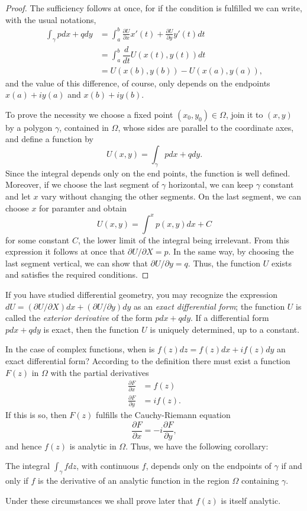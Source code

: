 \begin{proof}
The sufficiency follows at once, for if the condition is fulfilled we can write, with the usual notations,
\begin{align*}
    \int_{\gamma} p dx+q dy &= \int_{a}^{b} \frac{\partial U}{\partial x} x'(t) + \frac{\partial U}{\partial y} y'(t) dt \\
    &= \int_{a}^{b} \dfrac{d}{dt}U(x(t),y(t))dt \\
    &=U(x(b),y(b))-U(x(a),y(a)),
\end{align*}
and the value of this difference, of course, only depends on the endpoints $x(a)+iy(a)$ and $x(b)+iy(b)$.

To prove the necessity we choose a fixed point $(x_0,y_0) \in \Omega$, join it to $(x,y)$ by a polygon $\gamma$, contained in $\Omega$, whose sides are parallel to the coordinate axes, and define a function by $$U(x,y)=\int_{\gamma} p dx+q dy.$$ Since the integral depends only on the end points, the function is well defined. Moreover, if we choose the last segment of $\gamma$ horizontal, we can keep $\gamma$ constant and let $x$ vary without changing the other segments. On the last segment, we can choose $x$ for paramter and obtain $$U(x,y)=\int^{x}p(x,y)dx+C$$ for some constant $C$, the lower limit of the integral being irrelevant. From this expression it follows at once that $\partial U/\partial X=p$. In the same way, by choosing the last segment vertical, we can show that $\partial U/\partial y=q$. Thus, the function $U$ exists and satisfies the required conditions.
\end{proof}

If you have studied differential geometry, you may recognize the expression $dU=(\partial U/\partial X)dx+(\partial U/\partial y)dy$ as an \emph{exact differential form}; the function $U$ is called the \emph{exterior derivative} of the form $p dx+q dy$. If a differential form $p dx+q dy$ is exact, then the function $U$ is uniquely determined, up to a constant.

In the case of complex functions, when is $f(z)dz=f(z)dx+if(z)dy$ an exact differential form? According to the definition there must exist a function $F(z)$ in $\Omega$ with the partial derivatives
\begin{align*}
\frac{\partial F}{\partial x} &= f(z) \\
\frac{\partial F}{\partial y} &= if(z).
\end{align*}
If this is so, then $F(z)$ fulfills the Cauchy-Riemann equation $$\dfrac{\partial F}{\partial x}=-i\dfrac{\partial F}{\partial y},$$ and hence $f(z)$ is analytic in $\Omega$. Thus, we have the following corollary:
\begin{corollary}
\label{cor:line-integral-endpoints}
The integral $\int_{\gamma} fdz$, with continuous $f$, depends only on the endpoints of $\gamma$ if and only if $f$ is the derivative of an analytic function in the region $\Omega$ containing $\gamma$.
\end{corollary}
Under these circumstances we shall prove later that $f(z)$ is itself analytic.

